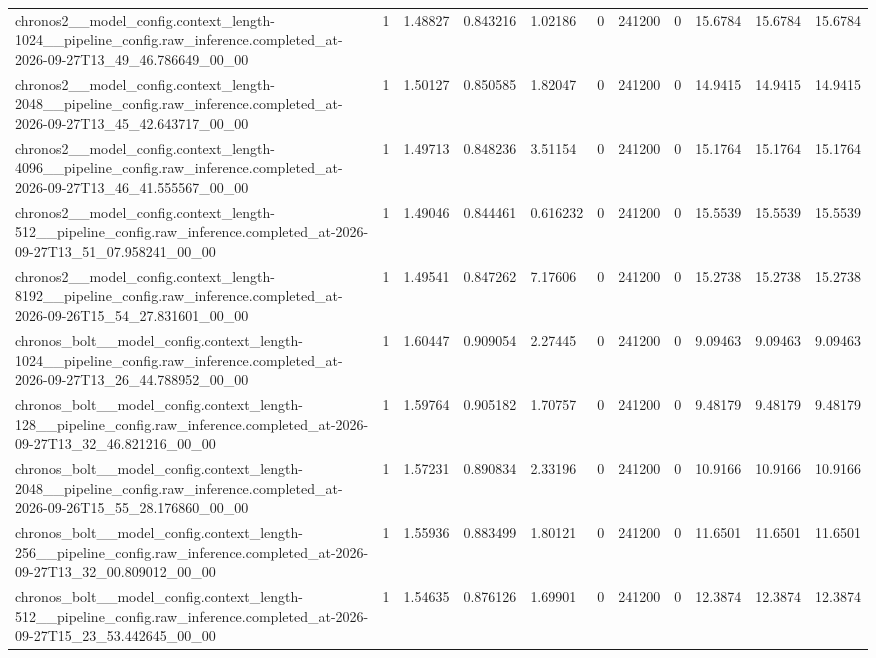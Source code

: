 \begin{tabular}{lllllllllll}
chronos2\_\_model\_config.context\_length-1024\_\_pipeline\_config.raw\_inference.completed\_at-2026-09-27T13\_49\_46.786649\_00\_00 & 1 & 1.48827 & 0.843216 & 1.02186 & 0 & 241200 & 0 & 15.6784 & 15.6784 & 15.6784 \\
chronos2\_\_model\_config.context\_length-2048\_\_pipeline\_config.raw\_inference.completed\_at-2026-09-27T13\_45\_42.643717\_00\_00 & 1 & 1.50127 & 0.850585 & 1.82047 & 0 & 241200 & 0 & 14.9415 & 14.9415 & 14.9415 \\
chronos2\_\_model\_config.context\_length-4096\_\_pipeline\_config.raw\_inference.completed\_at-2026-09-27T13\_46\_41.555567\_00\_00 & 1 & 1.49713 & 0.848236 & 3.51154 & 0 & 241200 & 0 & 15.1764 & 15.1764 & 15.1764 \\
chronos2\_\_model\_config.context\_length-512\_\_pipeline\_config.raw\_inference.completed\_at-2026-09-27T13\_51\_07.958241\_00\_00 & 1 & 1.49046 & 0.844461 & 0.616232 & 0 & 241200 & 0 & 15.5539 & 15.5539 & 15.5539 \\
chronos2\_\_model\_config.context\_length-8192\_\_pipeline\_config.raw\_inference.completed\_at-2026-09-26T15\_54\_27.831601\_00\_00 & 1 & 1.49541 & 0.847262 & 7.17606 & 0 & 241200 & 0 & 15.2738 & 15.2738 & 15.2738 \\
chronos\_bolt\_\_model\_config.context\_length-1024\_\_pipeline\_config.raw\_inference.completed\_at-2026-09-27T13\_26\_44.788952\_00\_00 & 1 & 1.60447 & 0.909054 & 2.27445 & 0 & 241200 & 0 & 9.09463 & 9.09463 & 9.09463 \\
chronos\_bolt\_\_model\_config.context\_length-128\_\_pipeline\_config.raw\_inference.completed\_at-2026-09-27T13\_32\_46.821216\_00\_00 & 1 & 1.59764 & 0.905182 & 1.70757 & 0 & 241200 & 0 & 9.48179 & 9.48179 & 9.48179 \\
chronos\_bolt\_\_model\_config.context\_length-2048\_\_pipeline\_config.raw\_inference.completed\_at-2026-09-26T15\_55\_28.176860\_00\_00 & 1 & 1.57231 & 0.890834 & 2.33196 & 0 & 241200 & 0 & 10.9166 & 10.9166 & 10.9166 \\
chronos\_bolt\_\_model\_config.context\_length-256\_\_pipeline\_config.raw\_inference.completed\_at-2026-09-27T13\_32\_00.809012\_00\_00 & 1 & 1.55936 & 0.883499 & 1.80121 & 0 & 241200 & 0 & 11.6501 & 11.6501 & 11.6501 \\
chronos\_bolt\_\_model\_config.context\_length-512\_\_pipeline\_config.raw\_inference.completed\_at-2026-09-27T15\_23\_53.442645\_00\_00 & 1 & 1.54635 & 0.876126 & 1.69901 & 0 & 241200 & 0 & 12.3874 & 12.3874 & 12.3874 \\

\end{tabular}

